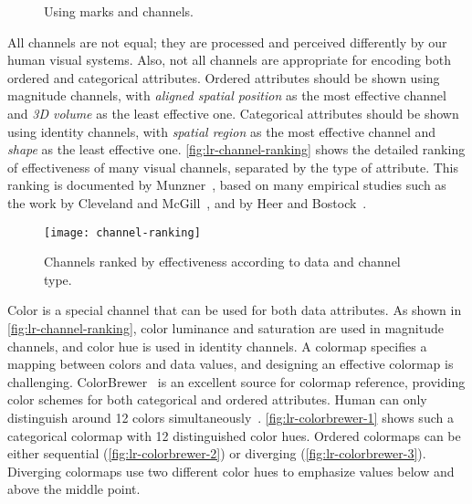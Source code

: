 \begin{figure}[!htb]
\centering
{} 
\hfill
{} 
\hfill
{}
\hfill
{}
\caption{Using marks and channels.}
\label{fig:lr-channel-example}
\end{figure}

All channels are not equal; they are processed and perceived differently by our human visual systems. Also, not all channels are appropriate for encoding both ordered and categorical attributes. Ordered attributes should be shown using magnitude channels, with \emph{aligned spatial position} as the most effective channel and \emph{3D volume} as the least effective one. Categorical attributes should be shown using identity channels, with \emph{spatial region} as the most effective channel and \emph{shape} as the least effective one. \autoref{fig:lr-channel-ranking} shows the detailed ranking of effectiveness of many visual channels, separated by the type of attribute. This ranking is documented by Munzner~\cite{Munzner2014}, based on many empirical studies such as the work by Cleveland and McGill~\cite{Cleveland1985}, and by Heer and Bostock~\cite{Heer2010a}.

\begin{figure}[!htb]
	\centering
	\texttt{[image: channel-ranking]}
	\caption{Channels ranked by effectiveness according to data and channel type. }
	\label{fig:lr-channel-ranking}
\end{figure}

Color is a special channel that can be used for both data attributes. As shown in \autoref{fig:lr-channel-ranking}, color luminance and saturation are used in magnitude channels, and color hue is used in identity channels. A colormap specifies a mapping between colors and data values, and designing an effective colormap is challenging. ColorBrewer~\cite{Harrower2003} is an excellent source for colormap reference, providing color schemes for both categorical and ordered attributes. Human can only distinguish around 12 colors simultaneously~\cite{Munzner2014}. \autoref{fig:lr-colorbrewer-1} shows such a categorical colormap with 12 distinguished color hues. Ordered colormaps can be either sequential (\autoref{fig:lr-colorbrewer-2}) or diverging (\autoref{fig:lr-colorbrewer-3}). Diverging colormaps use two different color hues to emphasize values below and above the middle point.

